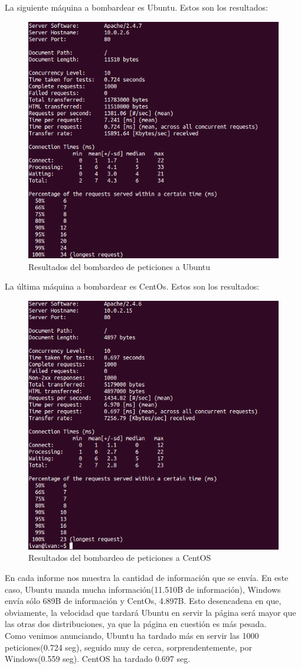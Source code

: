 \begin{itemize}
	La siguiente máquina a bombardear es Ubuntu. Estos son los resultados:\\
	\begin{figure}[H]
		\centering
		\includegraphics[width=0.6\linewidth]{Ubuntu-ab}
		\caption[Ubuntu-ab]{Resultados del bombardeo de peticiones a Ubuntu}
		\label{fig:Ubuntu-ab}
	\end{figure}
	La última máquina a bombardear es CentOs. Estos son los resultados:\\
	\begin{figure}[H]
		\centering
		\includegraphics[width=0.6\linewidth]{CentOS-ab}
		\caption[CentOS ab]{Resultados del bombardeo de peticiones a CentOS}
		\label{fig:Centos-ab}
	\end{figure}
	
	En cada informe nos muestra la cantidad de información que se envía. En este caso, Ubuntu manda mucha información(11.510B de información), Windows envía sólo 689B de información y CentOs, 4.897B. Esto desencadena en que, obviamente, la velocidad que tardará Ubuntu en servir la página será mayor que las otras dos distribuciones, ya que la página en cuestión es más pesada.\\
	Como venimos anunciando, Ubuntu ha tardado más en servir las 1000 peticiones(0.724 seg), seguido muy de cerca, sorprendentemente, por Windows(0.559 seg). CentOS ha tardado 0.697 seg.\\
	

\end{itemize}
